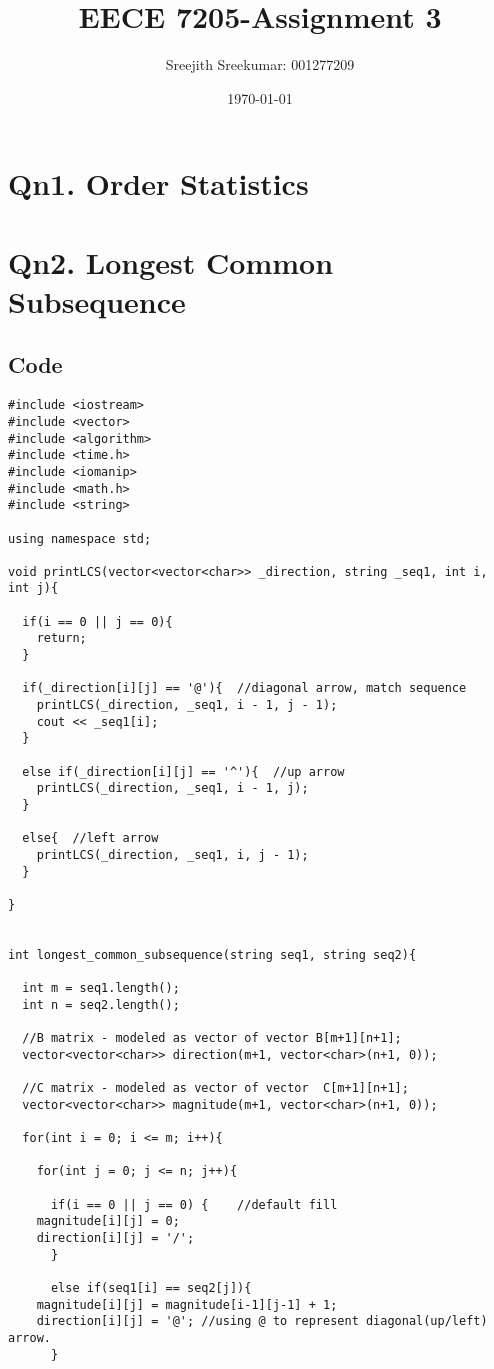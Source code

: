\documentclass{article}
\title{EECE 7205-Assignment 3}
\author{Sreejith Sreekumar: 001277209}
\date{\today}
\begin{document}
\maketitle
\section{Qn1. Order Statistics}

\section{Qn2. Longest Common Subsequence}

\subsection{Code}
\begin{verbatim}
#include <iostream>
#include <vector>
#include <algorithm>
#include <time.h>
#include <iomanip>
#include <math.h> 
#include <string>

using namespace std;

void printLCS(vector<vector<char>> _direction, string _seq1, int i, int j){
  
  if(i == 0 || j == 0){
    return;
  }

  if(_direction[i][j] == '@'){	//diagonal arrow, match sequence
    printLCS(_direction, _seq1, i - 1, j - 1);
    cout << _seq1[i];
  }
	
  else if(_direction[i][j] == '^'){  //up arrow
    printLCS(_direction, _seq1, i - 1, j);
  }
	
  else{	 //left arrow
    printLCS(_direction, _seq1, i, j - 1);
  }
  
}


int longest_common_subsequence(string seq1, string seq2){
  
  int m = seq1.length();
  int n = seq2.length();
	
  //B matrix - modeled as vector of vector B[m+1][n+1];
  vector<vector<char>> direction(m+1, vector<char>(n+1, 0));

  //C matrix - modeled as vector of vector  C[m+1][n+1];
  vector<vector<char>> magnitude(m+1, vector<char>(n+1, 0));
	
  for(int i = 0; i <= m; i++){
    
    for(int j = 0; j <= n; j++){
	
      if(i == 0 || j == 0) {	//default fill
	magnitude[i][j] = 0;
	direction[i][j] = '/';
      }
	  
      else if(seq1[i] == seq2[j]){
	magnitude[i][j] = magnitude[i-1][j-1] + 1;
	direction[i][j] = '@'; //using @ to represent diagonal(up/left) arrow.
      }
	  

\end{verbatim}
\end{document}
